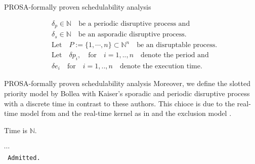\documentclass{beamer}
\begin{document}
 	
 	\begin{frame}{PROSA-formally proven schedulability analysis}
	 	\begin{definition}
		 	\begin{align}
		 & \delta_p \in \mathbb{N} \quad \text{be a periodic disruptive process and}\\
		 	&\delta_s \in  \mathbb{N} \quad \text{be an asporadic disruptive process.}\\
			 &\text{Let} \quad P := \{1, \cdots, n \} \subset \mathbb{N}^n \quad \text{be an disruptable process.}  \\
		 	&\text{Let} \quad  \delta p_i, \quad \text{for} \quad i = 1,..,n \quad  \text{denote the period and}  \\
		 	&\delta e_i \quad \text{for} \quad  i = 1,..,n \quad  \text{denote the execution time}.  
			\end{align}
		\end{definition}		
	\end{frame}
	
	\begin{frame}{PROSA-formally proven schedulability analysis}	
		Moreover, we define the slotted priority model by Bollea with Kaiser's sporadic and periodic disruptive process with a discrete time in contrast to these authors.
	This chioce is due to the real-time model from \cite{PROSA_schedubility_analysis} and the real-time kernel as in  \cite[chp. 5.3]{B} and the exclusion model  \cite[p.12]{B}.

	\begin{definition}
		Time is $\mathbb{N}$.
	\end{definition}	
	$\cdots$\\
	\lstinline! Admitted.!
 	\end{frame}
 	
 	
 	
 	
 	
		
\end{document}

